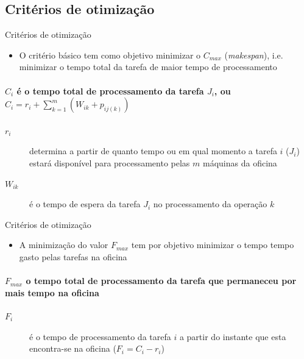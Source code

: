 \documentclass{beamer}
\begin{document}
\subsection{Critérios de otimização}
\begin{frame}{Critérios de otimização}
\begin{itemize}
\item<1-> O crit\'{e}rio b\'{a}sico tem como objetivo minimizar o $C_{max}$ (\textit{makespan}), i.e. minimizar o tempo total da
tarefa de maior tempo de processamento
\end{itemize}
\begin{center}
\paragraph{\indent $C_{i}$ \'{e} o tempo total de processamento da tarefa $J_{i}$, ou $C_{i} = r_{i}
+ \sum_{k=1}^{m}(W_{ik} + p_{ij(k)})$}
\end{center}
\begin{description}
\item[$r_{i}$] determina a partir de quanto tempo ou em qual momento a tarefa $i$ ($J_{i}$) estar\'{a} dispon\'{i}vel para
processamento pelas $m$ m\'{a}quinas da oficina
\item[$W_{ik}$] \'{e} o tempo de espera da tarefa $J_{i}$ no processamento da opera\c{c}\~{a}o $k$
\end{description}
\end{frame}
\begin{frame}{Critérios de otimização}
\begin{itemize}
\item<1-> A minimiza\c{c}\~{a}o do valor $F_{max}$ tem por objetivo minimizar o tempo tempo gasto pelas tarefas na oficina
\end{itemize}
\begin{center}
\paragraph{$F_{max}$ o tempo total de processamento da tarefa que permaneceu por mais tempo na oficina}
\end{center}
\begin{description}
\item[$F_{i}$] é o tempo de processamento da tarefa $i$ a partir do instante que esta encontra-se na oficina ($F_{i} = C_{i} - r_{i}$)
\end{description}
\end{frame}
\end{document}

